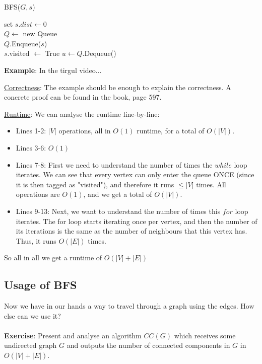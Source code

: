 \begin{algbox}{BFS($G, s$)}
  \begin{algorithm}[H]
 set $s.dist\leftarrow 0$ \\
 $Q\leftarrow$ new Queue \\ 
 $Q$.Enqueue($s$) \\
 $s$.visited $\leftarrow$ True
  {
 $u\leftarrow Q$.Dequeue()
      }
  \end{algorithm}
\end{algbox}
\textbf{Example}: In the tirgul video...

\underline{Correctness}: The example should be enough to explain the correctness. A concrete proof can be found in the book, page 597.


\underline{Runtime}: We can analyse the runtime line-by-line:
\begin{itemize}
\item Lines 1-2: $|V|$ operations, all in $O(1)$ runtime, for a total of $O(|V|)$.
\item Lines 3-6: $O(1)$
\item Lines 7-8: First we need to understand the number of times the $while$ loop iterates. We can see that every vertex can only enter the queue ONCE (since it is then tagged as "visited"), and therefore it runs $\leq |V|$ times. All operations are $O(1)$, and we get a total of $O(|V|)$. 
\item Lines 9-13: Next, we want to understand the number of times this $for$ loop iterates. 
The for loop starts iterating once per vertex, and then the number of its iterations is the same as the number of neighbours that this vertex has. Thus, it runs $O(|E|)$ times.
\end{itemize}
So all in all we get a runtime of $O(|V|+|E|)$

\subsection{Usage of BFS}
Now we have in our hands a way to travel  through a graph using the edges. How else can we use it?\\ \\ 
\textbf{Exercise}: Present and analyse an algorithm $CC(G)$ which receives some undirected graph $G$ and outputs the number of connected components in $G$ in $O(|V|+|E|)$. \\

